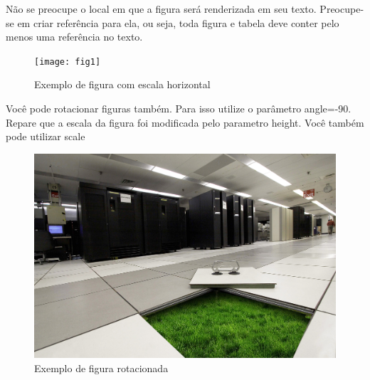\documentclass[	DIV=calc,%
							paper=a4,%
							fontsize=12pt,%
							onecolumn]{scrartcl}	 					%
\begin{document}
Não se preocupe o local em que a figura será renderizada em seu texto. Preocupe-se em criar referência para ela, ou seja, toda figura e tabela deve conter pelo menos uma referência no texto.

\begin{figure}
\centering
\texttt{[image: fig1]}
\caption{Exemplo de figura com escala horizontal}
\label{fig1}
\end{figure}



Você pode rotacionar figuras também. Para isso utilize o parâmetro angle=-90. Repare que a escala da figura foi modificada pelo parametro height. Você também pode utilizar scale

\begin{figure}
	\centering
	\includegraphics[height=\textwidth,angle=-90]{fig3}
	\caption{Exemplo de figura rotacionada}
	\label{fig3}
\end{figure}


\end{document}
